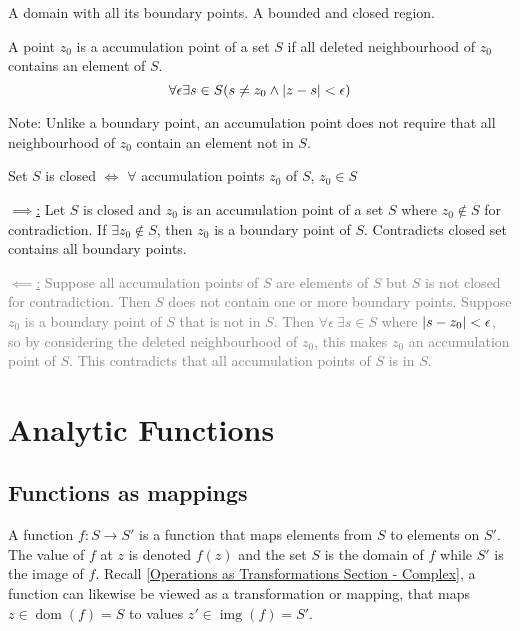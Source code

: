 \documentclass[12pt, english]{book}
\makeatletter
\renewenvironment{proof}[1][\proofname]{\par
	\pushQED{\qed}%
	\normalfont \topsep6\p@\@plus6\p@\relax
	\list{}{%
		\settowidth{\leftmargin}{\itshape\proofname:\hskip\labelsep}%
		\setlength{\labelwidth}{0pt}%
		\setlength{\itemindent}{-\leftmargin}%
	}%
	\item[\hskip\labelsep\itshape#1\@addpunct{:}]\ignorespaces
}{%
	\popQED\endlist\@endpefalse
}
\makeatother
\begin{document}
	\begin{definition}
		\label{Closed Regoin Definition - Complex}
		A domain with all its boundary points. A bounded and closed region.
	\end{definition}

	\begin{definition}
		\label{Accumulation/Limit Point Definition - Complex}
		A point $z_0$ is a accumulation point of a set $S$ if all deleted neighbourhood of $z_0$ contains an element of $S$. 
		$$\forall \epsilon \exists s \in S (s \neq z_0 \land \abs{z-s} < \epsilon)$$
	\end{definition}
	Note: Unlike a boundary point, an accumulation point does not require that all neighbourhood of $z_0$ contain an element not in $S$.
	
	\begin{theorem}
		Set $S$ is closed $\iff$ $\forall$ accumulation points $z_0$ of $S$, $z_0 \in S$
	\end{theorem}
	\begin{proof}
		\underline{$\implies$:}
		Let $S$ is closed and $z_0$ is an accumulation point of a set $S$ where $z_0 \notin S$ for contradiction. If $\exists z_0 \notin S$, then $z_0$ is a boundary point of $S$. Contradicts closed set contains all boundary points. 
		
		\textcolor{Grey}{
		\underline{$\impliedby$:}
		Suppose all accumulation points of $S$ are elements of $S$ but $S$ is not closed for contradiction. Then $S$ does not contain one or more boundary points. Suppose $z_0$ is a boundary point of $S$ that is not in $S$. Then $\forall \epsilon \ \exists s\in S$ where $\abs{s-z_0} < \epsilon$, so by considering the deleted neighbourhood of $z_0$, this makes $z_0$ an accumulation point of $S$. This contradicts that all accumulation points of $S$ is in $S$. 		
		}
	\end{proof}

	\chapter{Analytic Functions} \label{Analytic Functions Chapter - Complex}
	\section{Functions as mappings} \label{Functions as Mappings Section - Complex}
	A function $f: S \rightarrow S'$ is a function that maps elements from $S$ to elements on $S'$. The value of $f$ at $z$ is denoted $f(z)$ and the set $S$ is the domain of $f$ while $S'$ is the image of $f$. Recall \cref{Operations as Transformations Section - Complex}, a function can likewise be viewed as a transformation or mapping, that maps $z \in \operatorname{dom}(f) = S$ to values $z' \in \operatorname{img}(f) = S'$.
	
\end{document}
